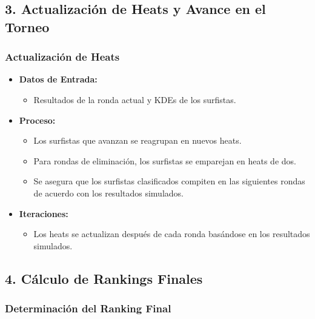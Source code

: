 \documentclass[12pt]{article}
\begin{document}
\subsection*{3. Actualización de Heats y Avance en el Torneo}

\subsubsection*{Actualización de Heats}

\begin{itemize}
    \item \textbf{Datos de Entrada:}
        \begin{itemize}
            \item Resultados de la ronda actual y KDEs de los surfistas.
        \end{itemize}
    \item \textbf{Proceso:}
        \begin{itemize}
            \item Los surfistas que avanzan se reagrupan en nuevos heats.
            \item Para rondas de eliminación, los surfistas se emparejan en heats de dos.
            \item Se asegura que los surfistas clasificados compiten en las siguientes rondas de acuerdo con los resultados simulados.
        \end{itemize}
    \item \textbf{Iteraciones:}
        \begin{itemize}
            \item Los heats se actualizan después de cada ronda basándose en los resultados simulados.
        \end{itemize}
\end{itemize}

\subsection*{4. Cálculo de Rankings Finales}

\subsubsection*{Determinación del Ranking Final}
\end{document}
